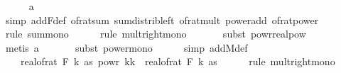 \begin{isabellebody}
\ \ \ \ \isamarkupfalse%
\ a{}\ \isamarkupfalse%
\ {\isacharparenleft}{\kern0pt}simp\ add{\isacharcolon}{\kern0pt}F{\isacharunderscore}{\kern0pt}def\ of{\isacharunderscore}{\kern0pt}rat{\isacharunderscore}{\kern0pt}sum\ sum{\isacharunderscore}{\kern0pt}distrib{\isacharunderscore}{\kern0pt}left\ of{\isacharunderscore}{\kern0pt}rat{\isacharunderscore}{\kern0pt}mult\ power{\isacharunderscore}{\kern0pt}add\ of{\isacharunderscore}{\kern0pt}rat{\isacharunderscore}{\kern0pt}power{\isacharparenright}{\kern0pt}\isanewline
\ \ \ \ \isamarkupfalse%
\ {\isacharparenleft}{\kern0pt}rule\ sum{\isacharunderscore}{\kern0pt}mono{\isacharparenright}{\kern0pt}\isanewline
\ \ \ \ \isamarkupfalse%
\ {\isacharparenleft}{\kern0pt}rule\ mult{\isacharunderscore}{\kern0pt}right{\isacharunderscore}{\kern0pt}mono{\isacharparenright}{\kern0pt}\isanewline
\ \ \ \ \ \isamarkupfalse%
\ {\isacharparenleft}{\kern0pt}subst\ powr{\isacharunderscore}{\kern0pt}realpow{\isacharparenright}{\kern0pt}\isanewline
\ \ \ \ \ \ \isamarkupfalse%
\ {\isacharparenleft}{\kern0pt}metis\ a{}{\isacharparenright}{\kern0pt}\isanewline
\ \ \ \ \ \isamarkupfalse%
\ {\isacharparenleft}{\kern0pt}subst\ power{\isacharunderscore}{\kern0pt}mono{\isacharparenright}{\kern0pt}\isanewline
\ \ \ \ \isamarkupfalse%
\ {\isacharparenleft}{\kern0pt}simp\ add{\isacharcolon}{\kern0pt}M{\isacharunderscore}{\kern0pt}def{\isacharparenright}{\kern0pt}{\isacharplus}{\kern0pt}\isanewline
\ \ \isamarkupfalse%
\ \isamarkupfalse%
\ {\isachardoublequoteopen}{\isachardot}{\kern0pt}{\isachardot}{\kern0pt}{\isachardot}{\kern0pt}\ {\isasymle}\ \ {\isacharparenleft}{\kern0pt}real{\isacharunderscore}{\kern0pt}of{\isacharunderscore}{\kern0pt}rat\ {\isacharparenleft}{\kern0pt}F\ k\ as{\isacharparenright}{\kern0pt}{\isacharparenright}{\kern0pt}\ powr\ {\isacharparenleft}{\kern0pt}{\isacharparenleft}{\kern0pt}k{\isacharminus}{\kern0pt}{}{\isacharparenright}{\kern0pt}{\isacharslash}{\kern0pt}k{\isacharparenright}{\kern0pt}\ {\isacharasterisk}{\kern0pt}\ {\isacharparenleft}{\kern0pt}real{\isacharunderscore}{\kern0pt}of{\isacharunderscore}{\kern0pt}rat\ {\isacharparenleft}{\kern0pt}F\ k\ as{\isacharparenright}{\kern0pt}{\isacharparenright}{\kern0pt}{\isachardoublequoteclose}\isanewline
\ \ \ \ \isamarkupfalse%
\ {\isacharparenleft}{\kern0pt}rule\ mult{\isacharunderscore}{\kern0pt}right{\isacharunderscore}{\kern0pt}mono{\isacharparenright}{\kern0pt}\isanewline

\end{isabellebody}
